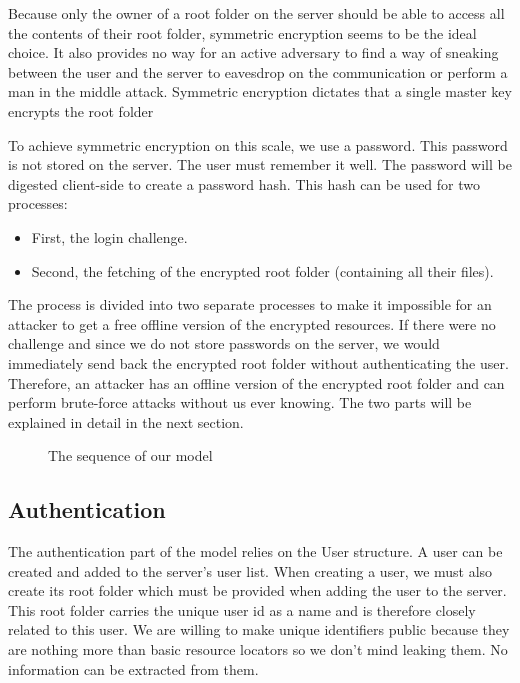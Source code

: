 Because only the owner of a root folder on the server should be able to access all the contents of their root folder, symmetric encryption seems to be the ideal choice. It also provides no way for an active adversary to find a way of sneaking between the user and the server to eavesdrop on the communication or perform a man in the middle attack. Symmetric encryption dictates that a single master key encrypts the root folder

To achieve symmetric encryption on this scale, we use a password. This password is not stored on the server. The user must remember it well. The password will be digested client-side to create a password hash. This hash can be used for two processes:
\begin{itemize}
    \item First, the login challenge. 
    \item Second, the fetching of the encrypted root folder (containing all their files).
\end{itemize}
The process is divided into two separate processes to make it impossible for an attacker to get a free offline version of the encrypted resources. If there were no challenge and since we do not store passwords on the server, we would immediately send back the encrypted root folder without authenticating the user. Therefore, an attacker has an offline version of the encrypted root folder and can perform brute-force attacks without us ever knowing. The two parts will be explained in detail in the next section.

\begin{minipage}{1\textwidth}
    \begin{figure}[H]
        \centering
        
        \caption{\label{fig:sequence_model} The sequence of our model  }
    \end{figure}
\end{minipage}

\subsection{Authentication}
The authentication part of the model relies on the User structure. A user can be created and added to the server's user list. When creating a user, we must also create its root folder which must be provided when adding the user to the server. This root folder carries the unique user id as a name and is therefore closely related to this user. We are willing to make unique identifiers public because they are nothing more than basic resource locators so we don't mind leaking them. No information can be extracted from them.
